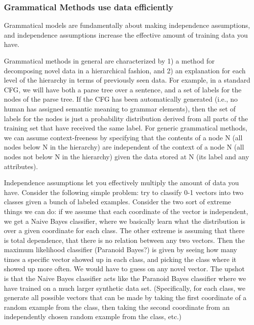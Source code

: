 \documentclass{article}
\begin{document}
\subsubsection{Grammatical Methods use data efficiently}
Grammatical models are fundamentally about making independence
assumptions, and independence assumptions increase the effective
amount of training data you have.

\begin{rem}
Grammatical methods in general are characterized by 1) a method for
decomposing novel data in a hierarchical fashion, and 2) an
explanation for each level of the hierarchy in terms of previously
seen data. For example, in a standard CFG, we will have both a parse
tree over a sentence, and a set of labels for the nodes of the parse
tree. If the CFG has been automatically generated (i.e., no human has
assigned semantic meaning to grammar elements), then the set of labels
for the nodes is just a probability distribution derived from all
parts of the training set that have received the same label. For
generic grammatical methods, we can assume context-freeness by
specifying that the contents of a node N (all nodes below N in the
hierarchy) are independent of the context of a node N (all nodes not
below N in the hierarchy) given the data stored at N (its label and
any attributes).
\end{rem}

\begin{rem}
Independence assumptions let you effectively multiply the amount of data
you have. Consider the following simple problem: try to classify 0-1
vectors into two classes given a bunch of labeled examples. Consider the
two sort of extreme things we can do: if we assume that each coordinate
of the vector is independent, we get a Naive Bayes classifier, where we
basically learn what the distribution is over a given coordinate for
each class. The other extreme is assuming that there is total
dependence, that there is no relation between any two vectors. Then the
maximum likelihood classifier (Paranoid Bayes?) is given by seeing how
many times a specific vector showed up in each class, and picking the
class where it showed up more often. We would have to guess on any novel
vector. The upshot is that the Naive Bayes classifier acts like the
Paranoid Bayes classifier where we have trained on a much larger
synthetic data set. (Specifically, for each class, we generate all
possible vectors that can be made by taking the first coordinate of a
random example from the class, then taking the second coordinate from an
independently chosen random example from the class, etc.)
\end{rem}
\end{document}
